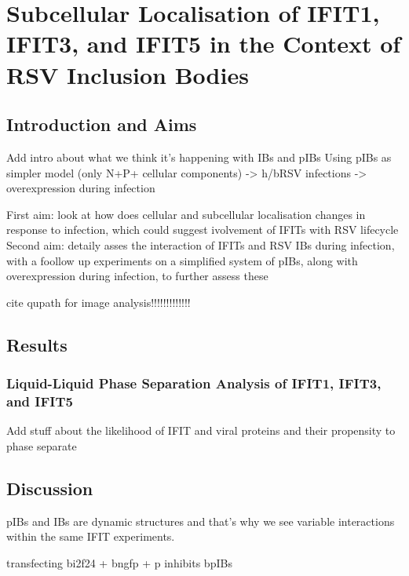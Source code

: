 \chapter{Subcellular Localisation of IFIT1, IFIT3, and IFIT5 in the Context of RSV Inclusion Bodies} \label{ch:Subcellular Localisation of IFIT1, IFIT3, and IFIT5 in the Context of RSV Inclusion Bodies}

\section{Introduction and Aims} \label{sec:Introduction and Aims-Chapter4}
Add intro about what we think it's happening with IBs and pIBs
Using pIBs as simpler model (only N+P+ cellular components) -> h/bRSV infections -> overexpression during infection

First aim: look at how does cellular and subcellular localisation changes in response to infection, which could suggest ivolvement of IFITs with RSV lifecycle
Second aim: detaily asses the interaction of IFITs and RSV IBs during infection, with a foollow up experiments on a simplified system of pIBs, along with overexpression during infection, to further assess these


cite qupath for image analysis!!!!!!!!!!!!!


\section{Results} \label{sec:Results-Chapter4}





\subsection{Liquid-Liquid Phase Separation Analysis of IFIT1, IFIT3, and IFIT5} \label{subsec:Liquid-Liquid Phase Separation Analysis of IFIT1, IFIT3, and IFIT5}
Add stuff about the likelihood of IFIT and viral proteins and their propensity to phase separate


\section{Discussion} \label{sec:Discussion-Chapter4}
pIBs and IBs are dynamic structures and that's why we see variable interactions within the same IFIT experiments.

transfecting bi2f24 + bngfp + p inhibits bpIBs